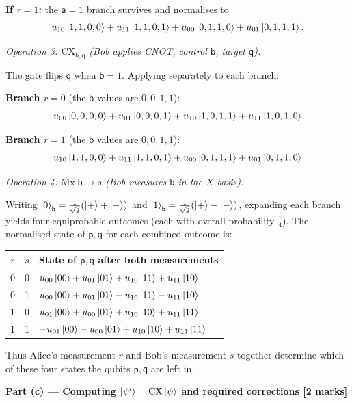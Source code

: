 \documentclass[12pt,a4paper]{article}
\begin{document}
\textbf{If $r=1$:} the $\mathsf{a}=1$ branch survives and normalises to
\[
  u_{10}\ket{1,1,0,0}+u_{11}\ket{1,1,0,1}+u_{00}\ket{0,1,1,0}+u_{01}\ket{0,1,1,1}.
\]

\medskip
\textit{Operation 3: $\mathrm{CX}_{\mathsf{b},\mathsf{q}}$ (Bob applies CNOT, control $\mathsf{b}$, target $\mathsf{q}$).}

The gate flips $\mathsf{q}$ when $\mathsf{b}=1$. Applying separately to each branch:

\textbf{Branch $r=0$} (the $\mathsf{b}$ values are $0,0,1,1$):
\[
  u_{00}\ket{0,0,0,0}+u_{01}\ket{0,0,0,1}+u_{10}\ket{1,0,1,1}+u_{11}\ket{1,0,1,0}
\]

\textbf{Branch $r=1$} (the $\mathsf{b}$ values are $0,0,1,1$):
\[
  u_{10}\ket{1,1,0,0}+u_{11}\ket{1,1,0,1}+u_{00}\ket{0,1,1,1}+u_{01}\ket{0,1,1,0}
\]

\medskip
\textit{Operation 4: $\mathrm{Mx}\;\mathsf{b}\to s$ (Bob measures $\mathsf{b}$ in the $X$-basis).}

Writing $\ket{0}_{\mathsf{b}}=\tfrac{1}{\sqrt{2}}(\ket{+}+\ket{-})$ and
$\ket{1}_{\mathsf{b}}=\tfrac{1}{\sqrt{2}}(\ket{+}-\ket{-})$,
expanding each branch yields four equiprobable outcomes (each with overall probability $\tfrac{1}{4}$).
The normalised state of $\mathsf{p,q}$ for each combined outcome is:

\begin{center}
\begin{tabular}{ccl}
\hline
$r$ & $s$ & State of $\mathsf{p,q}$ after both measurements \\
\hline
0 & 0 & $u_{00}\ket{00}+u_{01}\ket{01}+u_{10}\ket{11}+u_{11}\ket{10}$ \\
0 & 1 & $u_{00}\ket{00}+u_{01}\ket{01}-u_{10}\ket{11}-u_{11}\ket{10}$ \\
1 & 0 & $u_{01}\ket{00}+u_{00}\ket{01}+u_{10}\ket{10}+u_{11}\ket{11}$ \\
1 & 1 & $-u_{01}\ket{00}-u_{00}\ket{01}+u_{10}\ket{10}+u_{11}\ket{11}$ \\
\hline
\end{tabular}
\end{center}

Thus Alice's measurement $r$ and Bob's measurement $s$ together determine which of these four states the qubits $\mathsf{p,q}$ are left in.

\medskip
\textbf{Part (c) --- Computing $\ket{\psi'}=\mathrm{CX}\ket{\psi}$ and required corrections [2 marks]}
\end{document}

